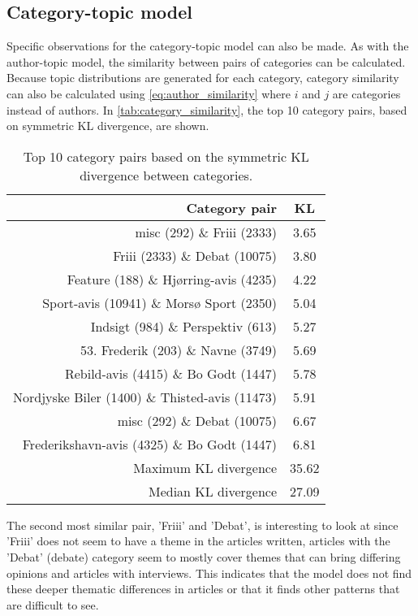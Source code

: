 \subsection{Category-topic model}\label{sec:discussion_category_topic} 
Specific observations for the category-topic model can also be made.
As with the author-topic model, the similarity between pairs of categories can be calculated.
Because topic distributions are generated for each category, category similarity can also be calculated using \autoref{eq:author_similarity} where $i$ and $j$ are categories instead of authors.
In \autoref{tab:category_similarity}, the top 10 category pairs, based on symmetric KL divergence, are shown.

\begin{table}[h]
	\centering
	\caption{Top 10 category pairs based on the symmetric KL divergence between categories.}
	\begin{tabular}{r|c}
		Category pair & KL \\
		\midrule
		misc (292) \& Friii (2333) & 3.65 \\
		Friii (2333) \& Debat (10075) & 3.80 \\
		Feature (188) \& Hjørring-avis (4235) & 4.22 \\
		Sport-avis (10941) \& Morsø Sport (2350) & 5.04 \\
		Indsigt (984) \& Perspektiv (613) & 5.27 \\
		53. Frederik (203) \& Navne (3749) & 5.69 \\
		Rebild-avis (4415) \& Bo Godt (1447) & 5.78 \\
		Nordjyske Biler (1400) \& Thisted-avis (11473) & 5.91 \\
		misc (292) \& Debat (10075) & 6.67 \\
		Frederikshavn-avis (4325) \& Bo Godt (1447) & 6.81 \\
		\midrule
		Maximum KL divergence & 35.62 \\
		Median KL divergence & 27.09 \\
	\end{tabular}
	\label{tab:category_similarity}
\end{table}

The second most similar pair, 'Friii' and 'Debat', is interesting to look at since 'Friii' does not seem to have a theme in the articles written, articles with the 'Debat' (debate) category seem to mostly cover themes that can bring differing opinions and articles with interviews.
This indicates that the model does not find these deeper thematic differences in articles or that it finds other patterns that are difficult to see.

